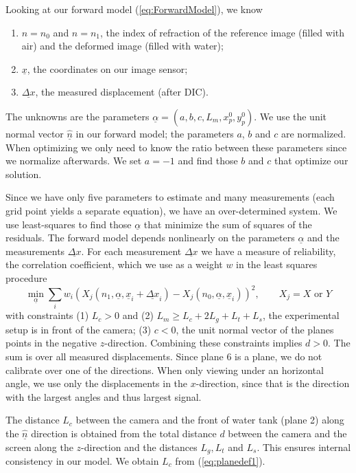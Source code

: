 \documentclass{svjour3}                     %
\begin{document}
\noindent Looking at our forward model (\ref{eq:ForwardModel}), we know
\begin{enumerate}
	\item $n=n_0$ and $n=n_1$, the index of refraction of the reference image (filled with air) and the deformed image (filled with water); 
	\item $\underline{x}$, the coordinates on our image sensor; 
	\item $\underline{\Delta x}$, the measured displacement (after DIC). 
\end{enumerate}
The unknowns are the parameters $\underline{\alpha} = (a, b, c, L_m, x_p^0, y_p^0)$. We use the unit normal vector $\underline{\hat{n}}$ in our forward model; the parameters $a$, $b$ and $c$ are normalized. When optimizing we only need to know the ratio between these parameters since we normalize afterwards. We set $a = - 1$ and find those $b$ and $c$ that optimize our solution. 

Since we have only five parameters to estimate and many measurements (each grid point yields a separate equation), we have an over-determined system. We use least-squares to find those $\underline{\alpha}$ that minimize the sum of squares of the residuals. The forward model depends nonlinearly on the parameters $\underline{\alpha}$ and the measurements $\underline{\Delta x}$. For each measurement $\underline{\Delta x}$ we have a measure of reliability, the correlation coefficient, which we use as a weight $w$ in the least squares procedure
\begin{equation}
\label{eq:calmin} 
	 \min_{\underline{\alpha}} \sum_i w_i \left(X_j(n_1, \underline{\alpha}, \underline{x}_i+\underline{\Delta x}_i) - X_j(n_0, \underline{\alpha}, \underline{x}_i)\right)^2, \qquad X_j = X \mbox{ or } Y
\end{equation}
with constraints (1) $L_c > 0$ and (2) $L_m \geq L_c + 2 L_g + L_t + L_s$, the experimental setup is in front of the camera; (3) $c < 0$, the unit normal vector of the planes points in the negative $z$-direction. Combining these constraints implies $d>0$. The sum is over all measured displacements. Since plane 6 is a plane, we do not calibrate over one of the directions. When only viewing under an horizontal angle, we use only the displacements in the $x$-direction, since that is the direction with the largest angles and thus largest signal. %

The distance $L_c$ between the camera and the front of water tank (plane 2) along the $\underline{\hat{n}}$ direction is obtained from the total distance $d$ between the camera and the screen along the $z$-direction and the distances $L_g, L_t$ and $L_s$. This ensures internal consistency in our model. We obtain $L_c$ from (\ref{eq:planedef1}).
\end{document}
